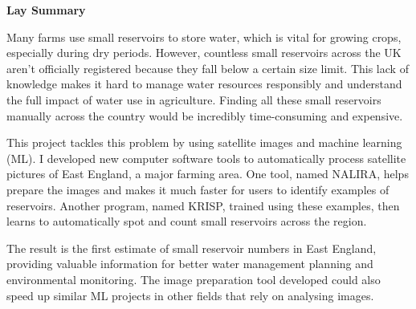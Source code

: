 \newpage
\thispagestyle{plain}
\begin{center}
    \LARGE
    \textbf{Lay Summary}
    \vspace{0.8cm}
\end{center}

Many farms use small reservoirs to store water, which is vital for growing crops, especially during dry periods. However, countless small reservoirs across the UK aren't officially registered because they fall below a certain size limit. This lack of knowledge makes it hard to manage water resources responsibly and understand the full impact of water use in agriculture. Finding all these small reservoirs manually across the country would be incredibly time-consuming and expensive.

This project tackles this problem by using satellite images and machine learning (ML). I developed new computer software tools to automatically process satellite pictures of East England, a major farming area. One tool, named NALIRA, helps prepare the images and makes it much faster for users to identify examples of reservoirs. Another program, named KRISP, trained using these examples, then learns to automatically spot and count small reservoirs across the region.

The result is the first estimate of small reservoir numbers in East England, providing valuable information for better water management planning and environmental monitoring. The image preparation tool developed could also speed up similar ML projects in other fields that rely on analysing images.